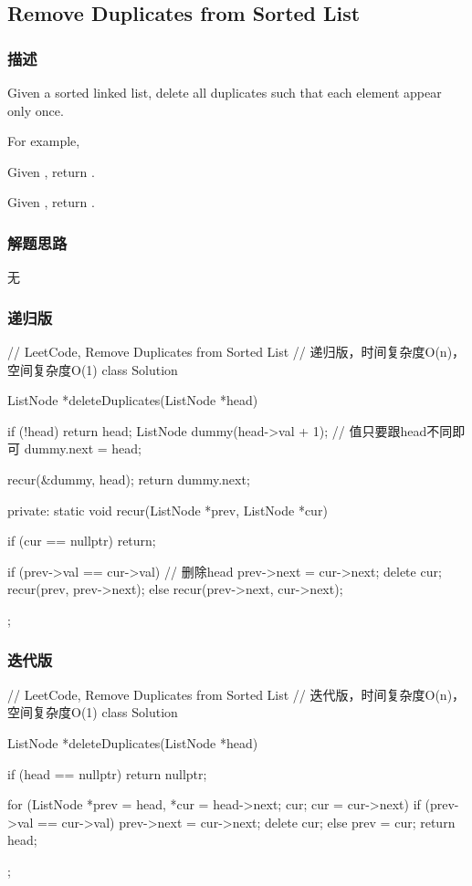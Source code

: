 \subsection{Remove Duplicates from Sorted List}
\label{sec:remove-duplicates-from-sorted-list}


\subsubsection{描述}
Given a sorted linked list, delete all duplicates such that each element appear 
only once.

For example,

Given , return .

Given , return .


\subsubsection{解题思路}
无


\subsubsection{递归版}
\begin{Code}
	// LeetCode, Remove Duplicates from Sorted List
	// 递归版，时间复杂度O(n)，空间复杂度O(1)
	class Solution {
		ListNode *deleteDuplicates(ListNode *head) {
			if (!head) return head;
				ListNode dummy(head->val + 1); // 值只要跟head不同即可
			dummy.next = head;
			
			recur(&dummy, head);
			return dummy.next;
		}
		private:
		static void recur(ListNode *prev, ListNode *cur) {
			if (cur == nullptr) return;
			
			if (prev->val == cur->val) { // 删除head
				prev->next = cur->next;
				delete cur;
				recur(prev, prev->next);
			} else {
				recur(prev->next, cur->next);
			}
		}
	};
\end{Code}


\subsubsection{迭代版}
\begin{Code}
	// LeetCode, Remove Duplicates from Sorted List
	// 迭代版，时间复杂度O(n)，空间复杂度O(1)
	class Solution {
		ListNode *deleteDuplicates(ListNode *head) {
			if (head == nullptr) return nullptr;
			
			for (ListNode *prev = head, *cur = head->next; cur; cur = 
				cur->next) {
				if (prev->val == cur->val) {
					prev->next = cur->next;
					delete cur;
				} else {
					prev = cur;
				}
			}
			return head;
		}
	};
\end{Code}


